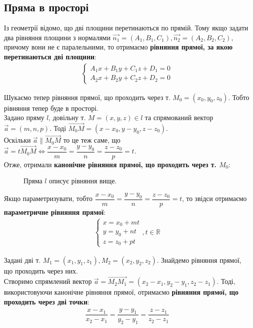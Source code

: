 \documentclass[a4paper, 10pt]{extarticle}
\theoremstyle{theoremdd}
\theoremstyle{theoremdd}
\theoremstyle{theoremdd}
\theoremstyle{theoremdd}
\theoremstyle{theoremdd}
\theoremstyle{theoremdd}
\theoremstyle{theoremdd}
\theoremstyle{theoremdd}
\begin{document}
\subsection{Пряма в просторі}
Із геометрії відомо, що дві площини перетинаються по прямій. Тому якщо задати два рівняння площини з нормалями $\vec{n_1} = (A_1,B_1,C_1), \vec{n_2} = (A_2,B_2,C_2)$, причому вони не є паралельними, то отримаємо \textbf{рівняння прямої, за якою перетинаються дві площини}:
\begin{align*}
\begin{cases}
A_1x + B_1y + C_1z + D_1 = 0 \\
A_2x + B_2y + C_2z + D_2 = 0
\end{cases}
\end{align*}

Шукаємо тепер рівняння прямої, що проходить через т. $M_0 = (x_0, y_0,z_0)$. Тобто рівняння тепер буде в просторі.\\
Задано пряму $l$, довільну т. $M = (x,y,z) \in l$ та спрямований вектор $\vec{a} = (m,n,p)$. Тоді $\overrightarrow{M_0M} = (x-x_0, y-y_0, z-z_0)$.\\
Оскільки $\vec{a} \parallel \overrightarrow{M_0M}$ то це теж саме, що $\vec{a} = t \overrightarrow{M_0 M} \iff \dfrac{x-x_0}{m} = \dfrac{y-y_0}{n} = \dfrac{z-z_0}{p} = t$.\\
Отже, отримали \textbf{канонічне рівняння прямої, що проходить через т. $M_0$}:
\begin{figure}[H]
\centering
{}
\caption*{Пряма $l$ описує рівняння вище.}
\end{figure}

Якщо параметризувати, тобто $\dfrac{x-x_0}{m} = \dfrac{y-y_0}{n} = \dfrac{z-z_0}{p} = t$, то звідси отримаємо \textbf{параметричне рівняння прямої}:
\begin{align*}
\begin{cases}
x = x_0 + mt\\
y = y_0 + nt\\
z = z_0 + pt
\end{cases}, t \in \mathbb{R}
\end{align*}

Задані дві т. $M_1 = (x_1,y_1,z_1), M_2 = (x_2,y_2,z_2)$. Знайдемо рівняння прямої, що проходить через них.\\
Створимо спрямлений вектор $\vec{a} = \overrightarrow{M_2M_1} = (x_2-x_1,y_2-y_1,z_2-z_1)$. Тоді, використовуючи канонічне рівняння прямої, отримаємо \textbf{рівняння прямої, що проходить через дві точки}:
\begin{align*}
\dfrac{x-x_1}{x_2-x_1} = \dfrac{y-y_1}{y_2-y_1} = \dfrac{z-z_1}{z_2-z_1}
\end{align*}
\end{document}
